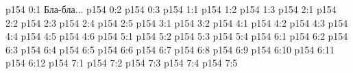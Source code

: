 \author{Промежуточные создания}
\vs p154 0:1  Бла-бла...
\vs p154 0:2 
\vs p154 0:3 
\vs p154 1:1 
\vs p154 1:2 
\vs p154 1:3 
\vs p154 2:1 
\vs p154 2:2 \pc 
\vs p154 2:3 
\vs p154 2:4 \pc 
\vs p154 2:5 
\vs p154 3:1 
\vs p154 3:2 
\vs p154 4:1 
\vs p154 4:2 
\vs p154 4:3 
\vs p154 4:4 
\vs p154 4:5 
\vs p154 4:6 \pc 
{}
\vs p154 5:1 
\vs p154 5:2 
\vs p154 5:3 
\vs p154 5:4 
\vs p154 6:1 
\vs p154 6:2 
\vs p154 6:3 
\vs p154 6:4 
\vs p154 6:5 
\vs p154 6:6 
\vs p154 6:7 
\vs p154 6:8 \pc 
\vs p154 6:9 
\vs p154 6:10 \pc 
\vs p154 6:11 
\vs p154 6:12 
\vs p154 7:1 
\vs p154 7:2 
\vs p154 7:3 
\vs p154 7:4 \pc 
\vs p154 7:5 
\quizlink
